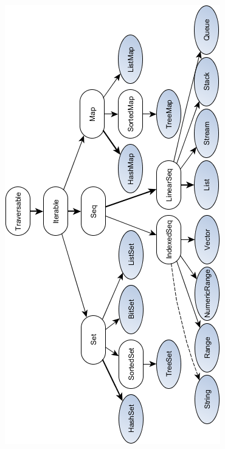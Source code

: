 \documentclass[a4paper,twoside,10pt,landscape]{article}
\begin{document}
\begin{multicols}{3}
\begin{center}
    \includegraphics[scale=.69]{scala-collection-immutable.png}
    \label{fig:scala-collection-immutable}
\end{center}


\end{multicols}
\end{document}
